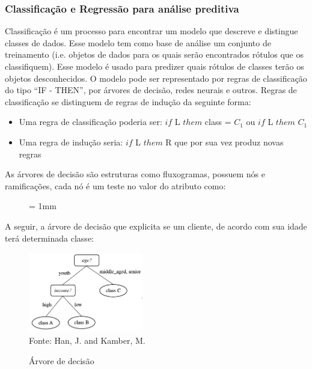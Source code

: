 \documentclass[conference,compsoc]{IEEEtran}
\begin{document}
\subsubsection{Classificação e Regressão para análise preditiva}

Classificação é um processo para encontrar um modelo que descreve e distingue classes de dados. 
Esse modelo tem como base de análise um conjunto de treinamento (i.e. objetos de dados para os quais 
serão encontrados rótulos que os classifiquem). 
Esse modelo é usado para predizer quais rótulos de classes terão os objetos desconhecidos.
O modelo pode ser representado por regras de classificação do tipo ``IF - THEN'', por árvores de decisão, redes neurais e outros. 
Regras de classificação se distinguem de regras de indução da seguinte forma:
\begin{itemize}
 \item Uma regra de classificação poderia ser: $if$ L $them$ class = $C_{1}$ ou $if$ L $them$  $C_{1}$
 \item Uma regra de indução seria: $ if$ L $them$ R que por sua vez produz novas regras 
\end{itemize}

As árvores de decisão são estruturas como fluxogramas, possuem nós e ramificações, 
cada nó é um teste no valor do atributo como:
\singlespace

\begin{figure}[ht] \unitlength= 1mm \thicklines
\end{figure}

\vspace{20mm}
  
A seguir, a árvore de decisão que explicita se um cliente, de acordo com sua idade terá determinada classe:
\begin{figure}[!ht]
\centering
\caption{Árvore de decisão}
\includegraphics[width=50mm, height=35mm]{Figuras/arvorejovem.png}\\
\tiny Fonte: Han, J. and Kamber, M. 
\end{figure}  
\end{document}
